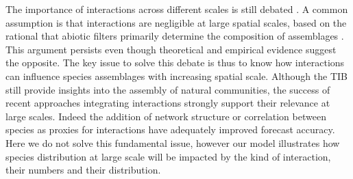 The importance of interactions across different scales is still debated \citep{Mcgill2010Ecology,Araujo2014Geographic}. A common assumption is that interactions are negligible at large spatial scales, based on the rational that abiotic filters primarily determine the composition of assemblages \citep{Pearson2003Predicting}. This argument persists even though theoretical \citep{Gravel2011Trophic} and empirical \citep{Gotelli2010Macroecological} evidence suggest the opposite. The key issue to solve this debate is thus to know how interactions can influence species assemblages with increasing spatial scale. Although the TIB still provide insights into the assembly of natural communities, the success of recent approaches integrating interactions strongly support their relevance at large scales. Indeed the addition of network structure \citep{Pellissier2013Combining} or correlation between species \citep{Pollock2014Understanding} as proxies for interactions have adequately improved forecast accuracy. Here we do not solve this fundamental issue, however our model illustrates how species distribution at large scale will be impacted by the kind of interaction, their numbers and their distribution.


